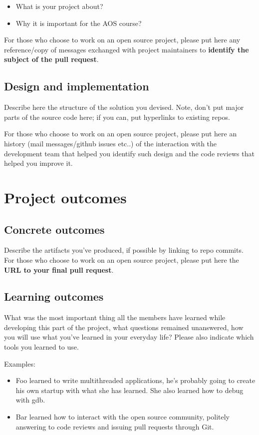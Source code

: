 \documentclass[10pt,a4]{article}
\begin{document}
\begin{itemize}
\item What is your project about?
\item Why it is important for the AOS course?
\end{itemize}

For those who choose to work on an open source project, please put here any
reference/copy of messages exchanged with project maintainers to \textbf{identify the subject
of the pull request}.

\subsection{Design and implementation}
Describe here the structure of the solution you devised. Note, don't put major
parts of the source code here; if you can, put hyperlinks to existing repos.

For those who choose to work on an open source project, please put here an
history (mail messages/github issues etc..) of the interaction with the
development team that helped you identify such design and the code reviews that
helped you improve it.

\section{Project outcomes}

\subsection{Concrete outcomes}
Describe the artifacts you've produced, if possible by linking to repo commits.
For those who choose to work on an open source project, please put here the 
\textbf{URL to your final pull request}.

\subsection{Learning outcomes}

What was the most important thing all the members have learned while
developing this part of the project, what questions remained unanswered,
how you will use what you've learned in your everyday life?
Please also indicate which tools you learned to use.

Examples:

\begin{itemize}
\item Foo learned to write multithreaded applications, he's probably going to
  create his own startup with what she has learned. She also learned how to
  debug with gdb.
\item Bar learned how to interact with the open source community, politely
  answering to code reviews and issuing pull requests through Git.
\end{itemize}
\end{document}
